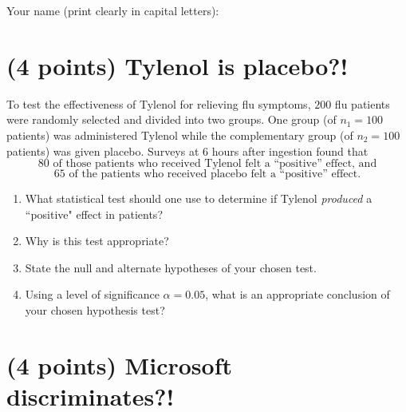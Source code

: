 \documentclass{ccg-topic}
\author{Joseph Timmer (Updated by Colton Grainger for Fall 2019)}
\date{2019-11-08}
\begin{document}
\maketitle

Your name (print clearly in capital letters): \underline{\hspace{10cm}}

\section*{(4 points) Tylenol is placebo?!}

To test the effectiveness of Tylenol for relieving flu symptoms, $200$ flu patients were randomly selected and divided into two groups. One group (of $n_1 = 100$ patients) was administered Tylenol while the complementary group (of $n_2 = 100$ patients) was given placebo. Surveys at $6$ hours after ingestion found that 
\begin{equation*}
    \text{$80$ of those patients who received Tylenol felt a ``positive'' effect, and}
\end{equation*}
\begin{equation*}
    \text{$65$ of the patients who received placebo felt a ``positive'' effect.}
\end{equation*}

\begin{enumerate}

\item What statistical test should one use to determine if Tylenol \emph{produced} a ``positive" effect in patients?

\vfill

\item Why is this test appropriate? 

\vfill

\item State the null and alternate hypotheses of your chosen test.

\vfill

\item Using a level of significance $\alpha = 0.05$, what is an appropriate conclusion of your chosen hypothesis test? 

\vfill

\end{enumerate}

\newpage

\section*{(4 points) Microsoft discriminates?!}
\end{document}
